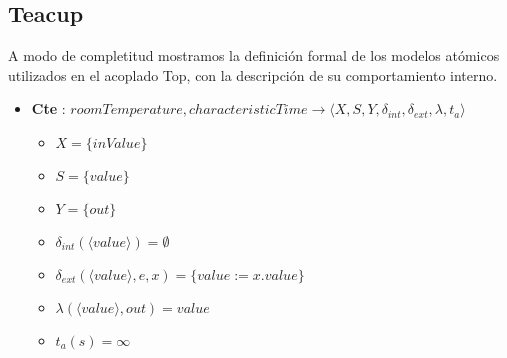 \subsection{Teacup}
A modo de completitud mostramos la definición formal de los modelos atómicos 
utilizados en el acoplado Top, con la descripción de su comportamiento interno.
\begin{itemize}
	
	\item \textbf{Cte} : $ roomTemperature, characteristicTime \rightarrow \langle X, S, Y, \delta_{int}, \delta_{ext}, \lambda, t_{a} \rangle$ \newline
	\begin{itemize}
		\item $ X = \{ inValue \} $ \newline
		\item $ S = \{ value \} $ \newline
		\item $ Y = \{ out \} $ \newline
		\item $ \delta_{int}(\langle value \rangle) = \emptyset $ \newline
		\item $ \delta_{ext} (\langle value \rangle, e, x)= \{ value := x.value \} $ \newline
		\item $ \lambda(\langle value \rangle, out) = value $ \newline
		\item $ t_{a}(s) = \infty $ 
	\end{itemize}
	

\end{itemize}
